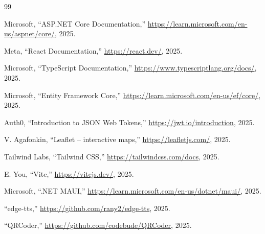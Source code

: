 \documentclass[a4paper,13pt]{report}
\begin{document}
\begin{thebibliography}{99}

 Microsoft, ``ASP.NET Core Documentation,'' \url{https://learn.microsoft.com/en-us/aspnet/core/}, 2025.

 Meta, ``React Documentation,'' \url{https://react.dev/}, 2025.

 Microsoft, ``TypeScript Documentation,'' \url{https://www.typescriptlang.org/docs/}, 2025.

 Microsoft, ``Entity Framework Core,'' \url{https://learn.microsoft.com/en-us/ef/core/}, 2025.

 Auth0, ``Introduction to JSON Web Tokens,'' \url{https://jwt.io/introduction}, 2025.

 V. Agafonkin, ``Leaflet -- interactive maps,'' \url{https://leafletjs.com/}, 2025.

 Tailwind Labs, ``Tailwind CSS,'' \url{https://tailwindcss.com/docs}, 2025.

 E. You, ``Vite,'' \url{https://vitejs.dev/}, 2025.

 Microsoft, ``.NET MAUI,'' \url{https://learn.microsoft.com/en-us/dotnet/maui/}, 2025.

 ``edge-tts,'' \url{https://github.com/rany2/edge-tts}, 2025.

 ``QRCoder,'' \url{https://github.com/codebude/QRCoder}, 2025.

\end{thebibliography}
\end{document}
